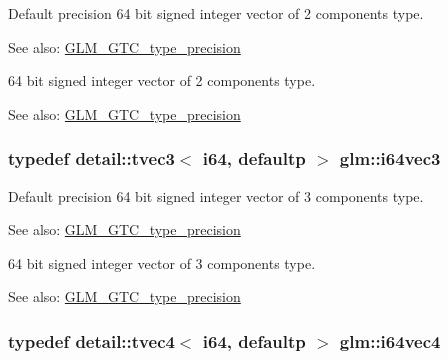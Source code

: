 Default precision 64 bit signed integer vector of 2 components type. \begin{Desc}
\item[See also:]\hyperlink{group__gtc__type__precision}{GLM\_\-GTC\_\-type\_\-precision}\end{Desc}
64 bit signed integer vector of 2 components type. \begin{Desc}
\item[See also:]\hyperlink{group__gtc__type__precision}{GLM\_\-GTC\_\-type\_\-precision} \end{Desc}
\hypertarget{group__gtc__type__precision_gb6eefcd7eb24e4142ed23dc1e87163a6}{
\subsubsection[i64vec3]{\setlength{\rightskip}{0pt plus 5cm}typedef detail::tvec3$<$ i64, defaultp $>$ {\bf glm::i64vec3}}}
\label{group__gtc__type__precision_gb6eefcd7eb24e4142ed23dc1e87163a6}


Default precision 64 bit signed integer vector of 3 components type. \begin{Desc}
\item[See also:]\hyperlink{group__gtc__type__precision}{GLM\_\-GTC\_\-type\_\-precision}\end{Desc}
64 bit signed integer vector of 3 components type. \begin{Desc}
\item[See also:]\hyperlink{group__gtc__type__precision}{GLM\_\-GTC\_\-type\_\-precision} \end{Desc}
\hypertarget{group__gtc__type__precision_g19846034cab6ee6e031884ea30def7fc}{
\subsubsection[i64vec4]{\setlength{\rightskip}{0pt plus 5cm}typedef detail::tvec4$<$ i64, defaultp $>$ {\bf glm::i64vec4}}}
\label{group__gtc__type__precision_g19846034cab6ee6e031884ea30def7fc}


